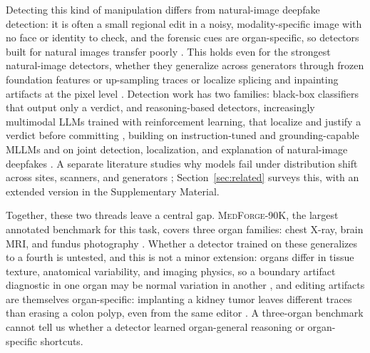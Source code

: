 \documentclass[10pt,twocolumn,letterpaper]{article}
\newcommand{\medforge}{\textsc{MedForge}}
\begin{document}
Detecting this kind of manipulation differs from natural-image deepfake detection: it is often a small regional edit in a noisy, modality-specific image with no face or identity to check, and the forensic cues are organ-specific, so detectors built for natural images transfer poorly \cite{medforge2026, natural_deepfake_survey_2024, biotampernet2026}. This holds even for the strongest natural-image detectors, whether they generalize across generators through frozen foundation features or up-sampling traces \cite{gan_fingerprint_detection_2020, clip_forgery_detection_2023, npr2024, fatformer2024} or localize splicing and inpainting artifacts at the pixel level \cite{trufor2023, hifinet2023}. Detection work has two families: black-box classifiers that output only a verdict, and reasoning-based detectors, increasingly multimodal LLMs trained with reinforcement learning, that localize and justify a verdict before committing \cite{medforge2026, vigil2026, grpo2024}, building on instruction-tuned and grounding-capable MLLMs \cite{llava15_2024, lisa2024} and on joint detection, localization, and explanation of natural-image deepfakes \cite{sida2025}. A separate literature studies why models fail under distribution shift across sites, scanners, and generators \cite{medical_domain_shift_2024, ood_generalization_survey_2024, fmsd2026, benchmark_diversity_2025}; Section~\ref{sec:related} surveys this, with an extended version in the Supplementary Material.

Together, these two threads leave a central gap. \medforge{}-90K, the largest annotated benchmark for this task, covers three organ families: chest X-ray, brain MRI, and fundus photography \cite{medforge2026}. Whether a detector trained on these generalizes to a fourth is untested, and this is not a minor extension: organs differ in tissue texture, anatomical variability, and imaging physics, so a boundary artifact diagnostic in one organ may be normal variation in another \cite{medical_domain_shift_2024, scanner_variability_2024}, and editing artifacts are themselves organ-specific: implanting a kidney tumor leaves different traces than erasing a colon polyp, even from the same editor \cite{lama2022}. A three-organ benchmark cannot tell us whether a detector learned organ-general reasoning or organ-specific shortcuts.
\end{document}

